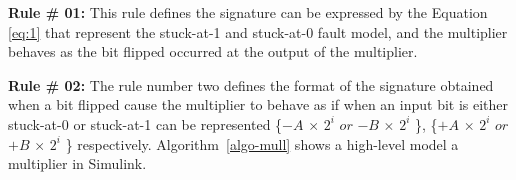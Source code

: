 \textbf{Rule \# 01:} This rule defines the signature can be expressed by the Equation \ref{eq:1} that represent the stuck-at-1 and stuck-at-0 fault model, and the multiplier behaves as the bit flipped occurred at the output of the multiplier. 

\textbf{Rule \# 02:} The rule number two defines the format of the signature obtained when a bit flipped cause the multiplier to behave as if when an input bit is either stuck-at-0 or stuck-at-1 can be represented \{$-$$A$ $\times$ $2^{i}$ $or$  $-$$B$ $\times$ $2^{i}$ \}, \{$+$$A$ $\times$ $2^{i}$ $or$  $+$$B$ $\times$ $2^{i}$ \} respectively. Algorithm~\ref{algo-mull} shows a high-level model a multiplier in Simulink.










